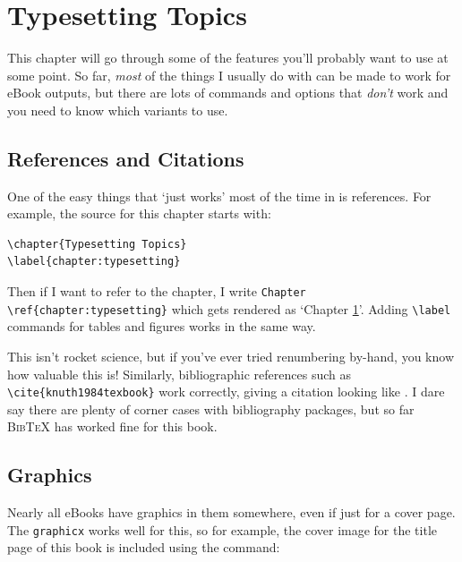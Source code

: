 \chapter{Typesetting Topics}
\label{chapter:typesetting}

This chapter will go through some of the \tex features you'll probably want to use at some point.
So far, {\em most} of the things I usually do with \tex can be made to work for eBook outputs,
but there are lots of commands and options that {\em don't} work and you need to know which
variants to use.

\section{References and Citations}

One of the easy things that `just works' most of the time in \latex is references. For example,
the \tex source for this chapter starts with:

\begin{verbatim}
\chapter{Typesetting Topics}
\label{chapter:typesetting}
\end{verbatim}

Then if I want to refer to the chapter, I write \verb|Chapter \ref{chapter:typesetting}| which
gets rendered as `Chapter \ref{chapter:typesetting}'. Adding \verb|\label| commands for tables and figures
works in the same way.

This isn't rocket science, but if you've ever tried
renumbering by-hand, you know how valuable this is! Similarly, bibliographic references such as
\verb|\cite{knuth1984texbook}| work correctly, giving a citation looking like \cite{knuth1984texbook}.
I dare say there are plenty of corner cases with bibliography packages, but so far \textsc{BibTeX} has worked
fine for this book.

\section{Graphics}

Nearly all eBooks have graphics in them somewhere, even if just for a cover page. 
The \texttt{graphicx} works well for this, so for example, the cover image for the title page
of this book is included using the command:


